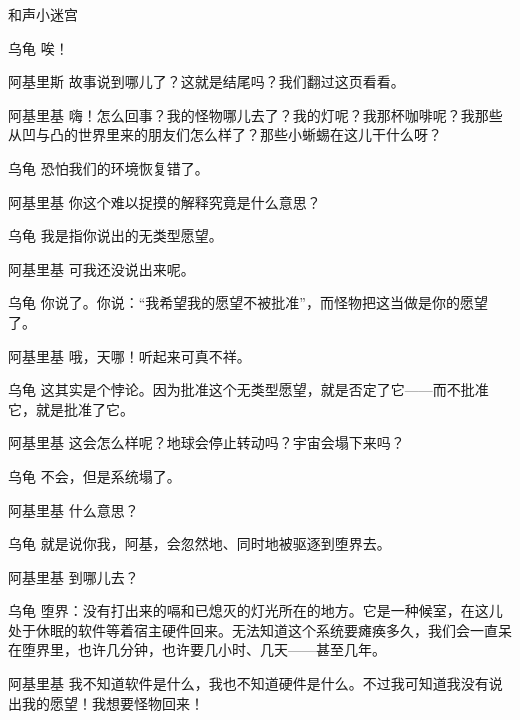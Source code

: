 \begin{dialog}{和声小迷宫}
\begin{dialogue}
\begin{dialogue}
  \item[乌龟\dlnote{（如释重负地）}]唉！

  \item[阿基里斯]故事说到哪儿了？这就是结尾吗？我们翻过这页看看。


  \begin{dialogue}
    \item[阿基里基]嗨！怎么回事？我的怪物哪儿去了？我的灯呢？我那杯咖啡呢？我那些从凹与凸的世界里来的朋友们怎么样了？那些小蜥蜴在这儿干什么呀？

    \item[乌龟]恐怕我们的环境恢复错了。

    \item[阿基里基]你这个难以捉摸的解释究竟是什么意思？

    \item[乌龟]我是指你说出的无类型愿望。

    \item[阿基里基]可我还没说出来呢。

    \item[乌龟]你说了。你说：“我希望我的愿望不被批准”，而怪物把这当做是你的愿望了。

    \item[阿基里基]哦，天哪！听起来可真不祥。

    \item[乌龟]这其实是个悖论。因为批准这个无类型愿望，就是否定了它——而不批准它，就是批准了它。

    \item[阿基里基]这会怎么样呢？地球会停止转动吗？宇宙会塌下来吗？

    \item[乌龟]不会，但是系统塌了。

    \item[阿基里基]什么意思？

    \item[乌龟]就是说你我，阿基，会忽然地、同时地被驱逐到堕界去。

    \item[阿基里基]到哪儿去？

    \item[乌龟]堕界：没有打出来的嗝和已熄灭的灯光所在的地方。它是一种候室，在这儿处于休眠的软件等着宿主硬件回来。无法知道这个系统要瘫痪多久，我们会一直呆在堕界里，也许几分钟，也许要几小时、几天——甚至几年。

    \item[阿基里基]我不知道软件是什么，我也不知道硬件是什么。不过我可知道我没有说出我的愿望！我想要怪物回来！


\end{dialogue}
\end{dialogue}
\end{dialogue}
\end{dialog}
